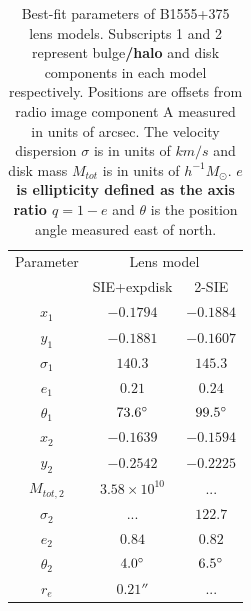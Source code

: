 \documentclass[useAMS,usenatbib]{mn2e}
\begin{document}
\begin{table}
  \caption{Best-fit parameters of B1555+375 lens models. Subscripts 1 and 2 represent bulge\textbf{/halo} and disk components in each model respectively. Positions are offsets from radio image component A measured in units of arcsec. The velocity dispersion $\sigma$ is in units of $km/s$ and disk mass $M_{tot}$ is in units of $h^{-1} M_{\odot}$. \textbf{$e$ is ellipticity defined as the axis ratio $q=1-e$ }and $\theta$ is the position angle measured east of north.}
  \begin{tabular}{@{}ccc}
\hline 
 Parameter  & \multicolumn{2}{c}{Lens model} \\
		&SIE+expdisk& 2-SIE		   
\\
\hline
$x_1$  	  & $-0.1794$	& $-0.1884$  \\
$y_1$	  &$-0.1881$	&$-0.1607$  \\

$\sigma_1$ &$140.3$     & $145.3$ \\
$e_1$	  & $0.21$	& $0.24$ \\
$\theta_1$ &$73.6 \hbox{$^\circ$}$ & $99.5 \hbox{$^\circ$}$ \\
\hline
$x_2$	  &$-0.1639$ 	&$-0.1594$  \\
$y_2$	  &$-0.2542$	& $-0.2225$  \\
$M_{tot,2}$  & $3.58\times 10^{10} $  & ...	 \\  
$\sigma_2$ & ...        &$122.7$ \\  
$e_2$	  &$0.84$	&$0.82$  \\
$\theta_2$ &$4.0\hbox{$^\circ$}$ &$6.5\hbox{$^\circ$}$  \\
$r_e$	  & $0.21 ''$ &  ... \\
\hline
\end{tabular}




\end{table}
\end{document}
